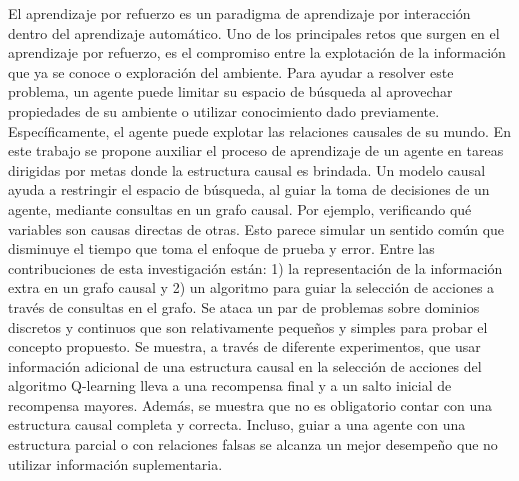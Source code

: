 
\begin{resumen}


El aprendizaje por refuerzo es un paradigma de aprendizaje por interacción 
dentro del aprendizaje automático. Uno de los principales retos que surgen en 
el aprendizaje por refuerzo, es el compromiso entre la 
explotación de la información que ya se conoce o 
exploración del ambiente. Para ayudar a resolver este problema, 
un agente puede limitar su espacio de búsqueda al 
aprovechar propiedades de su ambiente o utilizar 
conocimiento dado previamente. Específicamente, el agente
puede explotar las relaciones causales de su mundo. En este
trabajo se propone auxiliar el proceso de aprendizaje de
un agente en tareas dirigidas por metas donde la estructura
causal es brindada. 
Un modelo causal ayuda a restringir el espacio de búsqueda, al
guiar la toma de decisiones de un agente, mediante consultas en un grafo causal. Por ejemplo, verificando qué variables 
son causas directas de otras.
Esto parece simular un sentido común que disminuye el
tiempo que toma el enfoque de prueba y error.
Entre las contribuciones de esta investigación están: 1)
la representación de la información extra en un grafo causal y 2) un algoritmo para guiar la selección de acciones 
a través de consultas en el grafo.
Se ataca un par de problemas sobre dominios discretos y continuos que son relativamente pequeños y simples para
probar el concepto propuesto.
Se muestra, a través de diferente experimentos, que
usar información adicional de una estructura causal
en la selección de acciones del algoritmo Q-learning
lleva a una recompensa final y a un salto inicial de
recompensa mayores. Además, se muestra que
no es obligatorio contar con una estructura causal 
completa y correcta. Incluso, guiar a una agente con una estructura parcial o con relaciones falsas se alcanza un mejor desempeño que no utilizar información suplementaria.

\end{resumen}